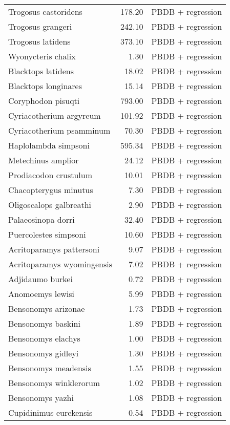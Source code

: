 \begin{table}[ht]
\begin{tabular}{lrl}
  Trogosus castoridens & 178.20 & PBDB + regression \\ 
  Trogosus grangeri & 242.10 & PBDB + regression \\ 
  Trogosus latidens & 373.10 & PBDB + regression \\ 
  Wyonycteris chalix & 1.30 & PBDB + regression \\ 
  Blacktops latidens & 18.02 & PBDB + regression \\ 
  Blacktops longinares & 15.14 & PBDB + regression \\ 
  Coryphodon pisuqti & 793.00 & PBDB + regression \\ 
  Cyriacotherium argyreum & 101.92 & PBDB + regression \\ 
  Cyriacotherium psamminum & 70.30 & PBDB + regression \\ 
  Haplolambda simpsoni & 595.34 & PBDB + regression \\ 
  Metechinus amplior & 24.12 & PBDB + regression \\ 
  Prodiacodon crustulum & 10.01 & PBDB + regression \\ 
  Chacopterygus minutus & 7.30 & PBDB + regression \\ 
  Oligoscalops galbreathi & 2.90 & PBDB + regression \\ 
  Palaeosinopa dorri & 32.40 & PBDB + regression \\ 
  Puercolestes simpsoni & 10.60 & PBDB + regression \\ 
  Acritoparamys pattersoni & 9.07 & PBDB + regression \\ 
  Acritoparamys wyomingensis & 7.02 & PBDB + regression \\ 
  Adjidaumo burkei & 0.72 & PBDB + regression \\ 
  Anomoemys lewisi & 5.99 & PBDB + regression \\ 
  Bensonomys arizonae & 1.73 & PBDB + regression \\ 
  Bensonomys baskini & 1.89 & PBDB + regression \\ 
  Bensonomys elachys & 1.00 & PBDB + regression \\ 
  Bensonomys gidleyi & 1.30 & PBDB + regression \\ 
  Bensonomys meadensis & 1.55 & PBDB + regression \\ 
  Bensonomys winklerorum & 1.02 & PBDB + regression \\ 
  Bensonomys yazhi & 1.08 & PBDB + regression \\ 
  Cupidinimus eurekensis & 0.54 & PBDB + regression \\ 

\end{tabular}
\end{table}
